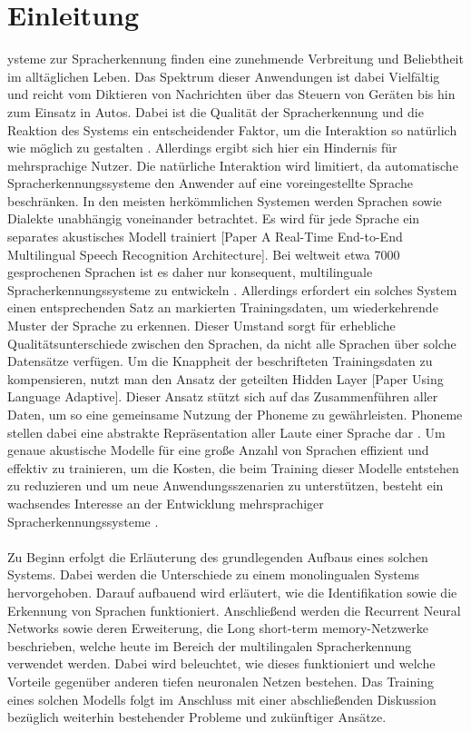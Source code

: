 \section{Einleitung}\label{sec:introduction}
ysteme zur Spracherkennung finden eine zunehmende Verbreitung und Beliebtheit im alltäglichen Leben. Das Spektrum dieser Anwendungen ist dabei Vielfältig und reicht vom Diktieren von Nachrichten über das Steuern von Geräten bis hin zum Einsatz in Autos. Dabei ist die Qualität der Spracherkennung und die Reaktion des Systems ein entscheidender Faktor, um die Interaktion so natürlich wie möglich zu gestalten \cite{Yu.2014}. Allerdings ergibt sich hier ein Hindernis für mehrsprachige Nutzer. Die natürliche Interaktion wird limitiert, da automatische Spracherkennungssysteme den Anwender auf eine voreingestellte Sprache beschränken. In den meisten herkömmlichen Systemen werden Sprachen sowie Dialekte unabhängig voneinander betrachtet. Es wird für jede Sprache ein separates akustisches Modell trainiert [Paper A Real-Time End-to-End Multilingual Speech Recognition Architecture]. Bei weltweit etwa 7000 gesprochenen Sprachen ist es daher nur konsequent, multilinguale Spracherkennungssysteme zu entwickeln \cite{Gary.2018}. Allerdings erfordert ein solches System einen entsprechenden Satz an markierten Trainingsdaten, um wiederkehrende Muster der Sprache zu erkennen. 
Dieser Umstand sorgt für erhebliche Qualitätsunterschiede zwischen den Sprachen, da nicht alle Sprachen über solche Datensätze verfügen. Um die Knappheit der beschrifteten Trainingsdaten zu kompensieren, nutzt man den Ansatz der geteilten Hidden Layer [Paper Using Language Adaptive]. Dieser Ansatz stützt sich auf das Zusammenführen aller Daten, um so eine gemeinsame Nutzung der Phoneme zu gewährleisten.  Phoneme stellen dabei eine abstrakte Repräsentation aller Laute einer Sprache dar \cite{Zissman.2001}. Um genaue akustische Modelle für eine große Anzahl von Sprachen effizient und effektiv zu trainieren, um die Kosten, die beim Training dieser Modelle entstehen zu reduzieren und um neue Anwendungsszenarien zu unterstützen, besteht ein wachsendes Interesse an der Entwicklung mehrsprachiger Spracherkennungssysteme \cite{Yu.2014}.
\\\\
Zu Beginn erfolgt die Erläuterung des grundlegenden Aufbaus eines solchen Systems. Dabei werden die Unterschiede zu einem monolingualen Systems hervorgehoben. Darauf aufbauend wird erläutert, wie die Identifikation sowie die Erkennung von Sprachen funktioniert. Anschließend werden die Recurrent Neural Networks sowie deren Erweiterung, die Long short-term memory-Netzwerke beschrieben, welche heute im Bereich der multilingalen Spracherkennung verwendet werden. Dabei wird beleuchtet, wie dieses funktioniert und welche Vorteile gegenüber anderen tiefen neuronalen Netzen bestehen. Das Training eines solchen Modells folgt im Anschluss mit einer abschließenden Diskussion bezüglich weiterhin bestehender Probleme und zukünftiger Ansätze.

